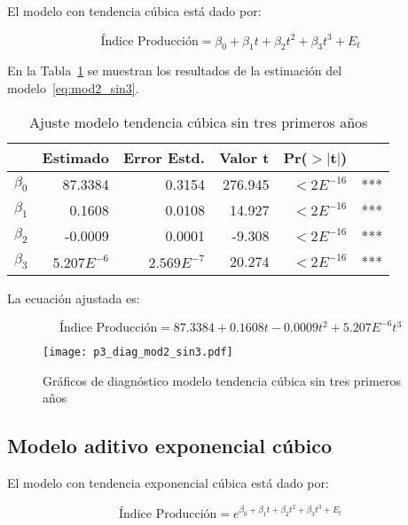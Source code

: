 \documentclass{tufte-handout}
\begin{document}
El modelo con tendencia cúbica está dado por:

\begin{equation} \label{eq:mod2_sin3}
	\text{Índice Producción} = \beta_0 + \beta_1 t + \beta_2 t^2 + \beta_3 t^3 + E_t
\end{equation}

En la Tabla~\ref{tab:mod2_sin3} se muestran los resultados de la estimación del modelo~\ref{eq:mod2_sin3}.

\begin{table}[ht]
\centering
\begin{tabular}{lrrrrl}
          & Estimado & Error Estd. & Valor t & Pr($>$$|$t$|$) & \\ 
  \hline
$\beta_0$ & 87.3384 & 0.3154 & 276.945 & $<2E^{-16}$ & *** \\ 
  $\beta_1$ & 0.1608 & 0.0108 & 14.927 & $<2E^{-16}$ & *** \\ 
  $\beta_2$ & -0.0009 & 0.0001 & -9.308 & $<2E^{-16}$ & *** \\ 
  $\beta_3$ & $5.207E^{-6}$ & $2.569E^{-7}$ & 20.274 & $<2E^{-16}$ & *** \\ 
   \hline
\end{tabular}
\caption{Ajuste modelo tendencia cúbica sin tres primeros años} 
\label{tab:mod2_sin3}
\end{table}

La ecuación ajustada es:

\begin{equation}
	\text{Índice Producción} = 87.3384 + 0.1608 t - 0.0009 t^2 + 5.207E^{-6} t^3
\end{equation}

\begin{figure*}[!ht]
    \texttt{[image: p3\_diag\_mod2\_sin3.pdf]}
    \caption{Gráficos de diagnóstico modelo tendencia cúbica sin tres primeros años}
    \label{fig:p3_diag_mod2_sin3.pdf}
\end{figure*}

\subsection*{Modelo aditivo exponencial cúbico}

El modelo con tendencia exponencial cúbica está dado por:

\begin{equation} \label{eq:mod3_sin3}
	\text{Índice Producción} = e^{\beta_0 + \beta_1 t + \beta_2 t^2 + \beta_3 t^3 + E_t}
\end{equation}
\end{document}
